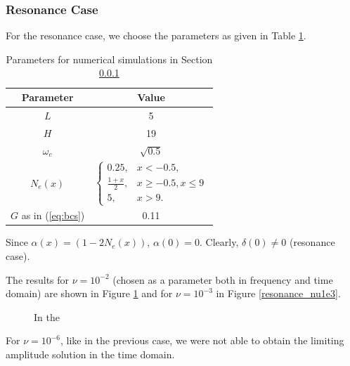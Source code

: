 \subsubsection{Resonance Case}
\label{sec:resn}
For the resonance case, we choose the parameters as given in Table \ref{tab:parameters_resonance}.
\begin{table}[htb!]
\begin{tabular}{c|c}
Parameter & Value \\
\hline
$L$ & 5\\
$H$ & 19\\
$\omega_c$ &  $\sqrt{0.5}$\\
$N_e(x)$ &  $\left\{
 \begin{array}{cc}
  0.25, & x<-0.5,\\
  \frac{1+x}{2}, & x\geq -0.5, x\leq 9\\
  5, & x>9.
 \end{array}\right.$\\
 $G$ as in (\ref{eq:bcs}) & 0.11 \\
\end{tabular}
\label{tab:parameters_resonance}
\caption{Parameters for numerical simulations in Section \ref{sec:resn}}
\end{table}
Since $\alpha(x)=(1-2N_e(x))$, $\alpha(0)=0$. Clearly, $\delta(0)\neq 0$ (resonance case).

The results for $\nu=10^{-2}$ (chosen as a parameter both in frequency and time domain) 
are shown in Figure \ref{fig:resonance_nu1e2} and for $\nu=10^{-3}$ in Figure \ref{resonance_nu1e3}. 
\begin{figure}
 
 \caption{In the }
 \label{fig:resonance_nu1e2}
\end{figure}


For $\nu=10^{-6}$, like in the previous case, we were not able to obtain the limiting amplitude solution in the time domain.



